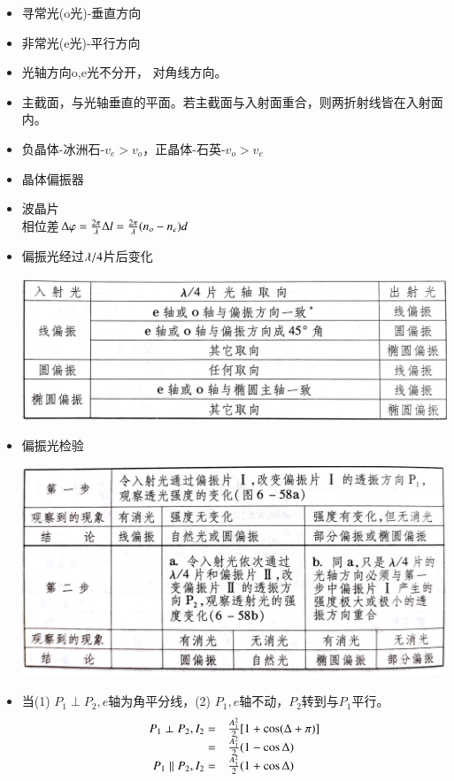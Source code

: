 \documentclass[UTF8,8pt]{ctexart}
\begin{document}
\begin{multicols}{3}
\begin{itemize}
    \item 寻常光(o光)-垂直方向
    \item 非常光(e光)-平行方向
    \item 光轴方向o,e光不分开， 对角线方向。
    \item 主截面，与光轴垂直的平面。若主截面与入射面重合，则两折射线皆在入射面内。
    \item 负晶体-冰洲石-$v_e>v_o$，正晶体-石英-$v_o>v_e$
\item 晶体偏振器
\item 波晶片\\
相位差$\Delta\varphi=\frac{2\pi}{\lambda}\Delta l=\frac{2\pi}{\lambda}(n_o-n_e)d$
\item 偏振光经过$\lambda/4$片后变化
\begin{center}
    \includegraphics[scale=0.1,angle=270]{9.jpg}
\end{center}
\item 偏振光检验
\begin{center}
    \includegraphics[scale=0.1,angle=270]{10.jpg}
\end{center}
\item 当(1) $P_1 \perp P_2,e$轴为角平分线，(2) $P_1,e$轴不动，$P_2$转到与$P_1$平行。
$$\begin{array}{rl} 
    P_1 \perp P_2,I_2=&\frac{A_1^2}{2}[1+\cos(\Delta+\pi)]\\
    =&\frac{A_1^2}{2}(1-\cos\Delta)\\
    P_1 \parallel P_2,I_2=&\frac{A_1^2}{2}(1+\cos\Delta)
 \end{array}$$
\end{itemize}
\end{multicols}
\end{document}
